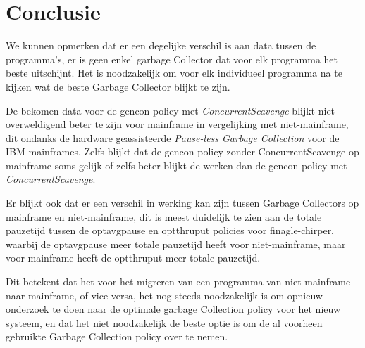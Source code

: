 
\chapter{Conclusie}%
\label{ch:conclusie}





We kunnen opmerken dat er een degelijke verschil is aan data tussen de programma's, er is geen enkel garbage Collector dat voor elk programma het beste uitschijnt.
Het is noodzakelijk om voor elk individueel programma na te kijken wat de beste Garbage Collector blijkt te zijn.


De bekomen data voor de gencon policy met \textit{ConcurrentScavenge} blijkt niet overweldigend beter te zijn voor mainframe in vergelijking met niet-mainframe, dit ondanks de hardware geassisteerde \textit{Pause-less Garbage Collection} voor de IBM mainframes.
Zelfs blijkt dat de gencon policy zonder ConcurrentScavenge op mainframe soms gelijk of zelfs beter blijkt de werken dan de gencon policy met \textit{ConcurrentScavenge}.


Er blijkt ook dat er een verschil in werking kan zijn tussen Garbage Collectors op mainframe en niet-mainframe, dit is meest duidelijk te zien aan de totale pauzetijd tussen de optavgpause en optthruput policies voor finagle-chirper, waarbij de optavgpause meer totale pauzetijd heeft voor niet-mainframe, maar voor mainframe heeft de optthruput meer totale pauzetijd.

Dit betekent dat het voor het migreren van een programma van niet-mainframe naar mainframe, of vice-versa, het nog steeds noodzakelijk is om opnieuw onderzoek te doen naar de optimale garbage Collection policy voor het nieuw systeem, en dat het niet noodzakelijk de beste optie is om de al voorheen gebruikte Garbage Collection policy over te nemen.